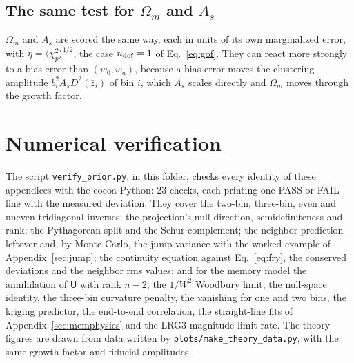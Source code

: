 \subsection{The same test for $\Omega_m$ and $A_s$}
\label{sec:inflationomas}

$\Omega_m$ and $A_s$ are scored the same way, each in units of its own
marginalized error, with $\eta = \langle \chi^2_p \rangle^{1/2}$, the
case $n_{\rm dof} = 1$ of Eq.~\eqref{eq:gof}.  They can react more
strongly to a bias error than $(w_0, w_a)$, because a bias error moves
the clustering amplitude $b_i^2 A_s D^2(\bar{z}_i)$ of bin $i$, which
$A_s$ scales directly and $\Omega_m$ moves through the growth factor.

\section{Numerical verification}
\label{app:verify}

The script \texttt{verify\_prior.py}, in this folder, checks every
identity of these appendices with the cocoa Python: $23$ checks, each
printing one PASS or FAIL line with the measured deviation.  They cover
the two-bin, three-bin, even and uneven tridiagonal inverses; the
projection's null direction, semidefiniteness and rank; the
Pythagorean split and the Schur complement; the neighbor-prediction
leftover and, by Monte Carlo, the jump variance with the worked example
of Appendix~\ref{sec:jump}; the continuity equation against
Eq.~\eqref{eq:fry}, the conserved deviations and the neighbor rms
values; and for the memory model the annihilation of $\mathsf{U}$ with
rank $n - 2$, the $1/W^2$ Woodbury limit, the null-space identity, the
three-bin curvature penalty, the vanishing for one and two bins, the
kriging predictor, the end-to-end correlation, the straight-line fits
of Appendix~\ref{sec:memphysics} and the LRG3 magnitude-limit rate.
The theory figures are drawn from data written by
\texttt{plots/make\_theory\_data.py}, with the same growth factor and
fiducial amplitudes.
